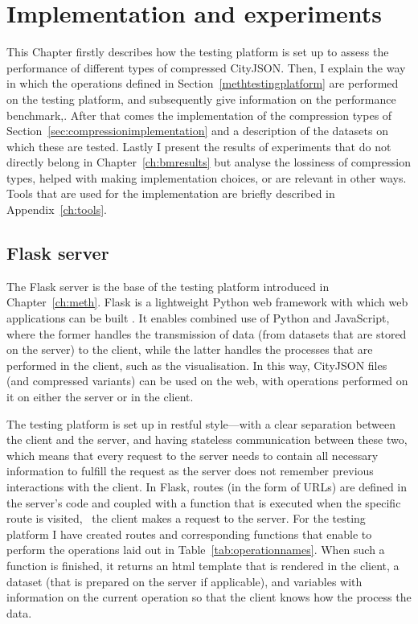 \chapter{Implementation and experiments}
This Chapter firstly describes how the testing platform is set up to assess the performance of different types of compressed CityJSON.
Then, I explain the way in which the operations defined in Section~\ref{methtestingplatform} are performed on the testing platform, and subsequently give information on the performance benchmark,.
After that comes the implementation of the compression types of Section~\ref{sec:compressionimplementation} and a description of the datasets on which these are tested.
Lastly I present the results of experiments that do not directly belong in Chapter~\ref{ch:bmresults} but analyse the lossiness of compression types, helped with making implementation choices, or are relevant in other ways.
Tools that are used for the implementation are briefly described in Appendix~\ref{ch:tools}.


\label{ch:impl}
\section{Flask server}


The Flask server is the base of the testing platform introduced in Chapter~\ref{ch:meth}.
Flask is a lightweight Python web framework with which web applications can be built \citep{Flask2020}.
It enables combined use of Python and JavaScript, where the former handles the transmission of data (from datasets that are stored on the server) to the client, while the latter handles the processes that are performed in the client, such as the visualisation.
In this way, CityJSON files (and compressed variants) can be used on the web, with operations performed on it on either the server or in the client.

The testing platform is set up in \ac{rest}ful \citep{Fielding2000} style---with a clear separation between the client and the server, and having stateless communication between these two, which means that every request to the server needs to contain all necessary information to fulfill the request as the server does not remember previous interactions with the client.
In Flask, routes (in the form of URLs) are defined in the server's code and coupled with a function that is executed when the specific route is visited, \ie\ the client makes a request to the server.
For the testing platform I have created routes and corresponding functions that enable to perform the operations laid out in Table~\ref{tab:operationnames}.
When such a function is finished, it returns an html template that is rendered in the client, a dataset (that is prepared on the server if applicable), and variables with information on the current operation so that the client knows how the process the data.

